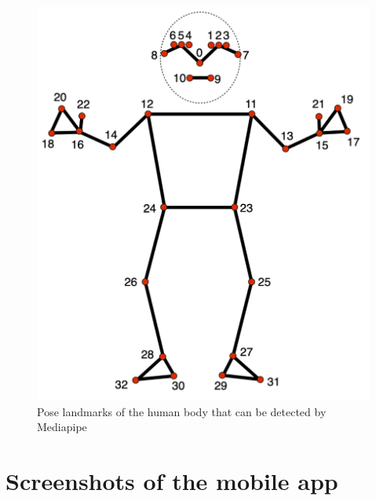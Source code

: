 \documentclass[12pt,a4paper]{report}
\begin{document}
\begin{itemize}
\begin{figure}[htbp]
    \centering
    \includegraphics[scale=0.3]{./pic/pose_landmarks_index.png}
    \caption{Pose landmarks of the human body that can be detected by Mediapipe}
    \label{fig:pose-landmarks}
  \end{figure}
\end{itemize}
\section{Screenshots of the mobile app}
\end{document}
